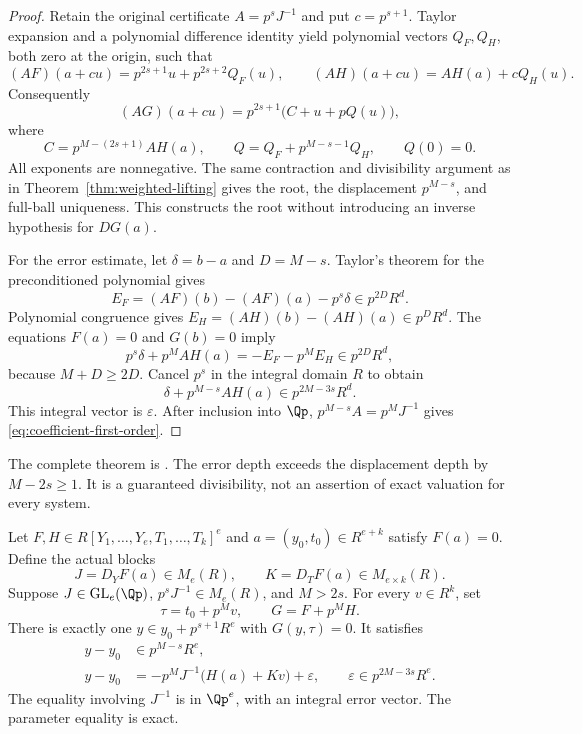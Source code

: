 \begin{proof}
Retain the original certificate $A=p^sJ^{-1}$ and put $c=p^{s+1}$.
Taylor expansion and a polynomial difference identity yield polynomial
vectors $Q_F,Q_H$, both zero at the origin, such that
\[
 (AF)(a+cu)=p^{2s+1}u+p^{2s+2}Q_F(u),\qquad
 (AH)(a+cu)=AH(a)+cQ_H(u).
\]
Consequently
\[
 (AG)(a+cu)=p^{2s+1}\bigl(C+u+pQ(u)\bigr),
\]
where
\[
 C=p^{M-(2s+1)}AH(a),\qquad
 Q=Q_F+p^{M-s-1}Q_H,\qquad Q(0)=0.
\]
All exponents are nonnegative. The same contraction and divisibility
argument as in Theorem~\ref{thm:weighted-lifting} gives the root,
the displacement $p^{M-s}$, and full-ball uniqueness. This constructs the
root without introducing an inverse hypothesis for $DG(a)$.

For the error estimate, let $\delta=b-a$ and $D=M-s$. Taylor's theorem
for the preconditioned polynomial gives
\[
 E_F=(AF)(b)-(AF)(a)-p^s\delta\in p^{2D}R^d.
\]
Polynomial congruence gives
$E_H=(AH)(b)-(AH)(a)\in p^DR^d$.
The equations $F(a)=0$ and $G(b)=0$ imply
\[
 p^s\delta+p^MAH(a)=-E_F-p^ME_H\in p^{2D}R^d,
\]
because $M+D\ge2D$. Cancel $p^s$ in the integral domain $R$ to obtain
\[
 \delta+p^{M-s}AH(a)\in p^{2M-3s}R^d.
\]
This integral vector is $\varepsilon$. After inclusion into $\Qp$,
$p^{M-s}A=p^MJ^{-1}$ gives \eqref{eq:coefficient-first-order}.
\end{proof}

The complete theorem is
.
The error depth exceeds the displacement depth by $M-2s\ge1$. It is a
guaranteed divisibility, not an assertion of exact valuation for every
system.

\begin{theorem}
\label{thm:joint-deformation}\leavevmode\par
Let $F,H\in R[Y_1,\ldots,Y_e,T_1,\ldots,T_k]^e$ and
$a=(y_0,t_0)\in R^{e+k}$ satisfy $F(a)=0$. Define the actual blocks
\[
 J=D_YF(a)\in M_e(R),\qquad K=D_TF(a)\in M_{e\times k}(R).
\]
Suppose $J\in\operatorname{GL}_e(\Qp)$,
$p^sJ^{-1}\in M_e(R)$, and $M>2s$. For every $v\in R^k$, set
\[
 \tau=t_0+p^Mv,\qquad G=F+p^MH.
\]
There is exactly one $y\in y_0+p^{s+1}R^e$ with $G(y,\tau)=0$.
It satisfies
\begin{equation}\label{eq:joint-first-order}
 \begin{aligned}
  y-y_0&\in p^{M-s}R^e,\\
  y-y_0&=-p^MJ^{-1}\bigl(H(a)+Kv\bigr)+\varepsilon,
  \qquad\varepsilon\in p^{2M-3s}R^e.
 \end{aligned}
\end{equation}
The equality involving $J^{-1}$ is in $\Qp^e$, with an integral error
vector. The parameter equality is exact.
\end{theorem}

